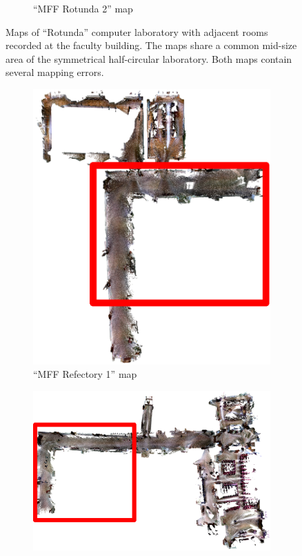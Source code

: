 \begin{figure}
\begin{subfigure}[b]{\textwidth}
        \caption{``MFF Rotunda 2'' map}
    \end{subfigure}
    \caption[MFF Rotunda maps]{Maps of ``Rotunda'' computer laboratory with adjacent rooms recorded at the faculty building. The maps share a common mid-size area of the symmetrical half-circular laboratory. Both maps contain several mapping errors.}
    \label{fig:mff_rotunda}
\end{figure}

\begin{figure}
    \centering
    \begin{subfigure}[b]{0.65\textwidth}
        \includegraphics[width=\textwidth]{../img/mff_refectory_1_highlight.png}
        \caption{``MFF Refectory 1'' map}
    \end{subfigure}
    \begin{subfigure}[b]{\textwidth}
        \includegraphics[width=\textwidth]{../img/mff_refectory_2_highlight.png}

\end{subfigure}
\end{figure}
